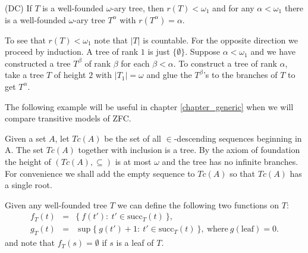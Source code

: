 \begin{example}{\rm {(DC)} }
If $T$ is a well-founded $\omega$-ary tree, then $r(T)<\omega_1$ and for any $\alpha<\omega_1$
 there is a well-founded $\omega$-ary tree $T^\alpha$ with $r(T^\alpha)=\alpha$.

\medskip

To see that $r(T)<\omega_1$ note that $|T|$ is countable. For the opposite direction
 we proceed by induction.
A tree of rank $1$ is just $\{\emptyset\}$. Suppose $\alpha<\omega_1$ and we have constructed a tree $T^\beta$ of rank $\beta$ for each $\beta<\alpha$.
To construct a tree of rank $\alpha$, take a tree $T$ of height $2$ with $|T_1|=\omega$ and glue the $T^\beta$'s to the branches of $T$ to
get $T^\alpha$.
%
%
\end{example}

The following example will be useful in chapter \ref{chapter_generic} when we will compare
transitive models of ZFC.

\begin{example}\label{transitive_closure}
Given a set $A$, let $Tc(A)$ be the set of all $\in$-descending sequences beginning in
A. The set $Tc(A)$ together with inclusion is a tree. By the axiom of foundation
the height of $(Tc(A),\subseteq)$ is at most $\omega$ and the tree has no infinite
branches. For convenience we shall add the empty sequence to $Tc(A)$ so that $Tc(A)$
has a single root.
\end{example}

Given any well-founded tree $T$ we can define the following two functions on $T$:
\begin{eqnarray*}
 f_T(t)  & = &  \{ \ f(t') : \ t' \in \mbox{succ}_T (t) \ \}, \\
 g_T(t)  & = &  \sup\{ \ g(t') + 1 : \ t' \in \mbox{succ}_T (t) \ \}, \
	\mbox{where} \ g(\mbox{leaf}) = 0.
\end{eqnarray*}
and note that $f_T(s)=\emptyset$ if $s$ is a leaf of $T$.

